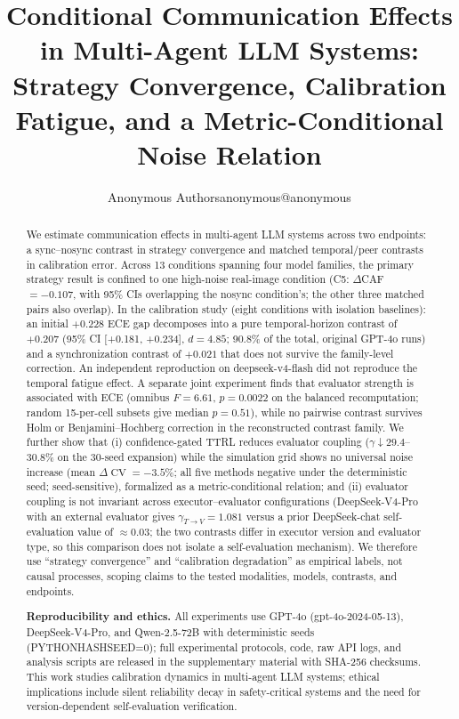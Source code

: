 \documentclass[11pt]{article}
\title{Conditional Communication Effects in Multi-Agent LLM Systems: Strategy Convergence, Calibration Fatigue, and a Metric-Conditional Noise Relation}
\author{\name Anonymous Authors\email anonymous@anonymous}  %
\date{}
\DeclareMathOperator{\CV}{CV}
\begin{document}
\maketitle

\begin{abstract}
We estimate communication effects in multi-agent LLM systems across two endpoints: a sync--nosync contrast in strategy convergence and matched temporal/peer contrasts in calibration error. Across 13 conditions spanning four model families, the primary strategy result is confined to one high-noise real-image condition (C5: $\Delta$CAF $=-0.107$, with 95\% CIs overlapping the nosync condition's; the other three matched pairs also overlap). In the calibration study (eight conditions with isolation baselines): an initial $+0.228$ ECE gap decomposes into a pure temporal-horizon contrast of $+0.207$ (95\% CI [+0.181, +0.234], $d{=}4.85$; 90.8\% of the total, original GPT-4o runs) and a synchronization contrast of $+0.021$ that does not survive the family-level correction. An independent reproduction on deepseek-v4-flash did not reproduce the temporal fatigue effect. A separate joint experiment finds that evaluator strength is associated with ECE (omnibus $F{=}6.61$, $p{=}0.0022$ on the balanced recomputation; random 15-per-cell subsets give median $p{=}0.51$), while no pairwise contrast survives Holm or Benjamini--Hochberg correction in the reconstructed contrast family. We further show that (i) confidence-gated TTRL reduces evaluator coupling ($\gamma \downarrow 29.4$--$30.8\%$ on the 30-seed expansion) while the simulation grid shows no universal noise increase (mean $\Delta\CV = -3.5\%$; all five methods negative under the deterministic seed; seed-sensitive), formalized as a metric-conditional relation; and (ii) evaluator coupling is not invariant across executor--evaluator configurations (DeepSeek-V4-Pro with an external evaluator gives $\gamma_{T\to V}{=}1.081$ versus a prior DeepSeek-chat self-evaluation value of $\approx 0.03$; the two contrasts differ in executor version and evaluator type, so this comparison does not isolate a self-evaluation mechanism). We therefore use ``strategy convergence'' and ``calibration degradation'' as empirical labels, not causal processes, scoping claims to the tested modalities, models, contrasts, and endpoints.


	\textbf{Reproducibility and ethics.} All experiments use GPT-4o (gpt-4o-2024-05-13), DeepSeek-V4-Pro, and Qwen-2.5-72B with deterministic seeds (PYTHONHASHSEED=0); full experimental protocols, code, raw API logs, and analysis scripts are released in the supplementary material with SHA-256 checksums. This work studies calibration dynamics in multi-agent LLM systems; ethical implications include silent reliability decay in safety-critical systems and the need for version-dependent self-evaluation verification.\end{abstract}
\end{document}
